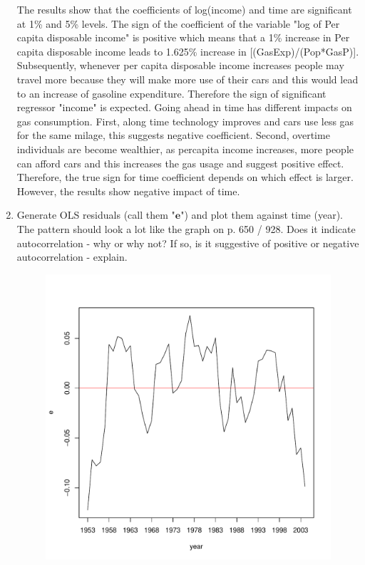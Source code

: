 \documentclass[11pt,reqno]{amsart}\usepackage[]{graphicx}\usepackage[]{color}
\makeatletter
\def\maxwidth{ %
  \ifdim\Gin@nat@width>\linewidth
    \linewidth
  \else
    \Gin@nat@width
  \fi
}
\newenvironment{knitrout}{}{} %
\newcommand{\mlt}[1]{\mathbf{#1}} %
\newcommand{\ke}{\mlt{e}}
\makeatother
\begin{document}
\begin{enumerate}
The results show that the coefficients of log(income) and time are significant at 1\% and 5\% levels. The sign of the coefficient of the variable "log of Per capita disposable income" is positive which means that a 1\% increase in Per capita disposable income leads to 1.625\% increase in [(GasExp)/(Pop*GasP)]. Subsequently, whenever per capita disposable income increases people may travel more because they will make more use of their cars and this would lead to an increase of gasoline expenditure.  Therefore the sign of significant regressor "income" is expected. Going ahead in time has different impacts on gas consumption. First, along time technology improves and cars use less gas for the same milage, this suggests negative coefficient. Second, overtime individuals are become wealthier, as percapita income increases, more people can afford cars and this increases the gas usage and suggest positive effect. Therefore, the true sign for time coefficient depends on which effect is larger. However, the results show negative impact of time.  \\

\item
Generate OLS residuals (call them "$\ke$") and plot them against time (year).  The pattern should look a lot like the graph on p. 650 / 928.  Does it indicate autocorrelation - why or why not? If so, is it suggestive of positive or negative autocorrelation - explain. \\ 

\begin{figure}[!ht]
\centering
\begin{knitrout}
\color{fgcolor}
\includegraphics[width=\maxwidth]{figure/theme-R5-1} 


\end{knitrout}
\end{figure}
\end{enumerate}
\end{document}
